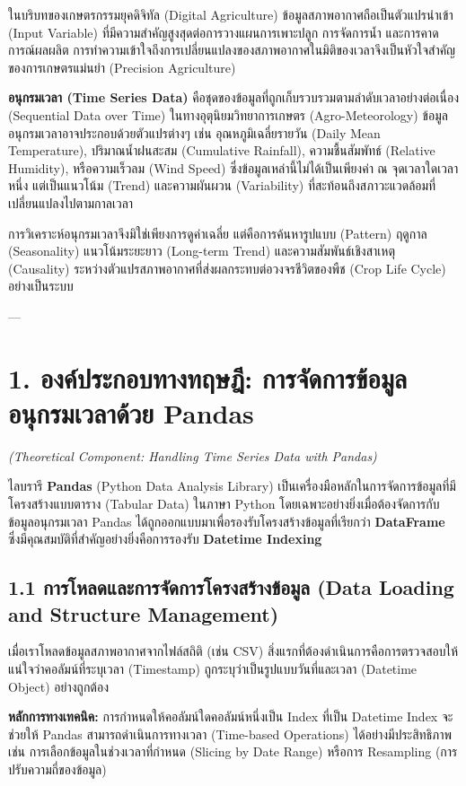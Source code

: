 \documentclass[11pt,a4paper,openany]{report}
\begin{document}
ในบริบทของเกษตรกรรมยุคดิจิทัล (Digital Agriculture) ข้อมูลสภาพอากาศถือเป็นตัวแปรนำเข้า (Input Variable) ที่มีความสำคัญสูงสุดต่อการวางแผนการเพาะปลูก การจัดการน้ำ และการคาดการณ์ผลผลิต การทำความเข้าใจถึงการเปลี่ยนแปลงของสภาพอากาศในมิติของเวลาจึงเป็นหัวใจสำคัญของการเกษตรแม่นยำ (Precision Agriculture)

\textbf{อนุกรมเวลา (Time Series Data)} คือชุดของข้อมูลที่ถูกเก็บรวบรวมตามลำดับเวลาอย่างต่อเนื่อง (Sequential Data over Time) ในทางอุตุนิยมวิทยาการเกษตร (Agro-Meteorology) ข้อมูลอนุกรมเวลาอาจประกอบด้วยตัวแปรต่างๆ เช่น อุณหภูมิเฉลี่ยรายวัน (Daily Mean Temperature), ปริมาณน้ำฝนสะสม (Cumulative Rainfall), ความชื้นสัมพัทธ์ (Relative Humidity), หรือความเร็วลม (Wind Speed) ซึ่งข้อมูลเหล่านี้ไม่ได้เป็นเพียงค่า ณ จุดเวลาใดเวลาหนึ่ง แต่เป็นแนวโน้ม (Trend) และความผันผวน (Variability) ที่สะท้อนถึงสภาวะแวดล้อมที่เปลี่ยนแปลงไปตามกาลเวลา

การวิเคราะห์อนุกรมเวลาจึงมิใช่เพียงการดูค่าเฉลี่ย แต่คือการค้นหารูปแบบ (Pattern) ฤดูกาล (Seasonality) แนวโน้มระยะยาว (Long-term Trend) และความสัมพันธ์เชิงสาเหตุ (Causality) ระหว่างตัวแปรสภาพอากาศที่ส่งผลกระทบต่อวงจรชีวิตของพืช (Crop Life Cycle) อย่างเป็นระบบ

---

\section{1. องค์ประกอบทางทฤษฎี: การจัดการข้อมูลอนุกรมเวลาด้วย Pandas}

\textit{(Theoretical Component: Handling Time Series Data with Pandas)}

ไลบรารี \textbf{Pandas} (Python Data Analysis Library) เป็นเครื่องมือหลักในการจัดการข้อมูลที่มีโครงสร้างแบบตาราง (Tabular Data) ในภาษา Python โดยเฉพาะอย่างยิ่งเมื่อต้องจัดการกับข้อมูลอนุกรมเวลา Pandas ได้ถูกออกแบบมาเพื่อรองรับโครงสร้างข้อมูลที่เรียกว่า \textbf{DataFrame} ซึ่งมีคุณสมบัติที่สำคัญอย่างยิ่งคือการรองรับ \textbf{Datetime Indexing}

\subsection{1.1 การโหลดและการจัดการโครงสร้างข้อมูล (Data Loading and Structure Management)}

เมื่อเราโหลดข้อมูลสภาพอากาศจากไฟล์สถิติ (เช่น CSV) สิ่งแรกที่ต้องดำเนินการคือการตรวจสอบให้แน่ใจว่าคอลัมน์ที่ระบุเวลา (Timestamp) ถูกระบุว่าเป็นรูปแบบวันที่และเวลา (Datetime Object) อย่างถูกต้อง

\textbf{หลักการทางเทคนิค:}
การกำหนดให้คอลัมน์ใดคอลัมน์หนึ่งเป็น Index ที่เป็น Datetime Index จะช่วยให้ Pandas สามารถดำเนินการทางเวลา (Time-based Operations) ได้อย่างมีประสิทธิภาพ เช่น การเลือกข้อมูลในช่วงเวลาที่กำหนด (Slicing by Date Range) หรือการ Resampling (การปรับความถี่ของข้อมูล)
\end{document}
